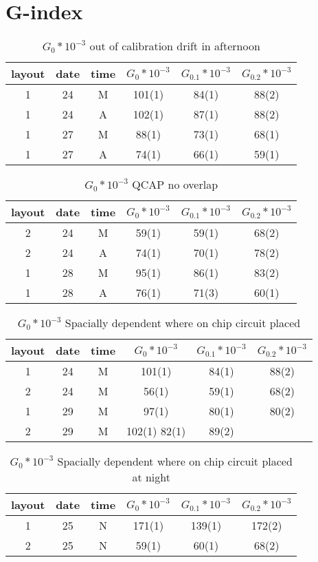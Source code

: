 \documentclass[main.tex]{subfiles}
\begin{document}
\section{G-index}

\begin{table}
\begin{tabular}{cccccc}
layout & date & time & $G_0*10^{-3}$ & $G_{0.1} * 10^{-3}$ & $G_{0.2} * 10^{-3}$\\\hline
1 & 24 & M & 101(1) & 84(1) & 88(2)\\
1 & 24 & A & 102(1) & 87(1) & 88(2)\\
1 & 27 & M & 88(1) & 73(1) & 68(1)\\
1 & 27 & A & 74(1)& 66(1) & 59(1)\\
\end{tabular}
\caption{$G_0 * 10^{-3}$ out of calibration drift in afternoon}
\end{table}

\begin{table}
\begin{tabular}{cccccc}
layout & date & time & $G_0*10^{-3}$ & $G_{0.1} * 10^{-3}$ & $G_{0.2} * 10^{-3}$\\\hline
2 & 24 & M & 59(1) & 59(1) & 68(2)\\
2 & 24 & A & 74(1) & 70(1) & 78(2)\\
1 & 28 & M & 95(1)& 86(1) & 83(2)\\
1 & 28 & A & 76(1)& 71(3) & 60(1)\\
\end{tabular}
\caption{$G_0 * 10^{-3}$ QCAP no overlap}
\end{table}

\begin{table}
\begin{tabular}{cccccc}
layout & date & time & $G_0*10^{-3}$ & $G_{0.1} * 10^{-3}$ & $G_{0.2} * 10^{-3}$\\\hline
1 & 24 & M & 101(1) & 84(1) & 88(2)\\
2 & 24 & M & 56(1) & 59(1) & 68(2)\\
1 & 29 & M & 97(1) & 80(1) & 80(2)\\
2 & 29 & M & 102(1) 82(1) & 89(2)\\
\end{tabular}
\caption{$G_0 * 10^{-3}$ Spacially dependent where on chip circuit placed}
\end{table}

\begin{table}
\begin{tabular}{cccccc}
layout & date & time & $G_0*10^{-3}$ & $G_{0.1} * 10^{-3}$ & $G_{0.2} * 10^{-3}$\\\hline
1 & 25 & N & 171(1) & 139(1) & 172(2)\\
2 & 25 & N & 59(1) & 60(1) & 68(2)\\
\end{tabular}
\caption{$G_0 * 10^{-3}$ Spacially dependent where on chip circuit placed at night}
\end{table}
\end{document}
